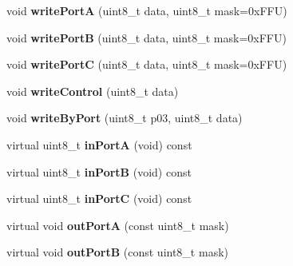 \begin{DoxyCompactItemize}
\item 
\hypertarget{classIntel8255_aba502bfd8176cd843afb53ed8249b02e}{void {\bfseries write\-Port\-A} (uint8\-\_\-t data, uint8\-\_\-t mask=0x\-F\-F\-U)}\label{classIntel8255_aba502bfd8176cd843afb53ed8249b02e}

\item 
\hypertarget{classIntel8255_ac0713f4c2044142742a5749802be95c6}{void {\bfseries write\-Port\-B} (uint8\-\_\-t data, uint8\-\_\-t mask=0x\-F\-F\-U)}\label{classIntel8255_ac0713f4c2044142742a5749802be95c6}

\item 
\hypertarget{classIntel8255_ad2698cf223a87e741bac7c1d30b10423}{void {\bfseries write\-Port\-C} (uint8\-\_\-t data, uint8\-\_\-t mask=0x\-F\-F\-U)}\label{classIntel8255_ad2698cf223a87e741bac7c1d30b10423}

\item 
\hypertarget{classIntel8255_a65938641a443329e477299bd6a7afda5}{void {\bfseries write\-Control} (uint8\-\_\-t data)}\label{classIntel8255_a65938641a443329e477299bd6a7afda5}

\item 
\hypertarget{classIntel8255_aa6679f39867668adf330fd5dce0ee19d}{void {\bfseries write\-By\-Port} (uint8\-\_\-t p03, uint8\-\_\-t data)}\label{classIntel8255_aa6679f39867668adf330fd5dce0ee19d}

\item 
\hypertarget{classIntel8255_a387e1edf0b09feea29362f1854398237}{virtual uint8\-\_\-t {\bfseries in\-Port\-A} (void) const }\label{classIntel8255_a387e1edf0b09feea29362f1854398237}

\item 
\hypertarget{classIntel8255_a5e4a8c34778bef66b5d2ddcf7b372be1}{virtual uint8\-\_\-t {\bfseries in\-Port\-B} (void) const }\label{classIntel8255_a5e4a8c34778bef66b5d2ddcf7b372be1}

\item 
\hypertarget{classIntel8255_ac02d52c1bf5c0fb0478dfb0ffb1b8ec8}{virtual uint8\-\_\-t {\bfseries in\-Port\-C} (void) const }\label{classIntel8255_ac02d52c1bf5c0fb0478dfb0ffb1b8ec8}

\item 
\hypertarget{classIntel8255_a15b8c1a78f8f1ca7ac90b92cc329f7d0}{virtual void {\bfseries out\-Port\-A} (const uint8\-\_\-t mask)}\label{classIntel8255_a15b8c1a78f8f1ca7ac90b92cc329f7d0}

\item 
\hypertarget{classIntel8255_a3004cbfc1a1eade447d2e312bc1faa29}{virtual void {\bfseries out\-Port\-B} (const uint8\-\_\-t mask)}\label{classIntel8255_a3004cbfc1a1eade447d2e312bc1faa29}


\end{DoxyCompactItemize}
